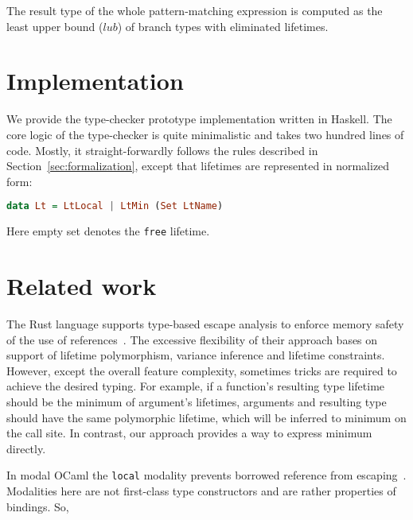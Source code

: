 \documentclass[11pt]{article}
\begin{document}
    The result type of the whole pattern-matching expression is computed as the least upper bound ($lub$) of branch types with eliminated lifetimes.


    \section{Implementation} \label{sec:implementation}

    We provide the type-checker prototype implementation written in Haskell.
    The core logic of the type-checker is quite minimalistic and takes two hundred lines of code.
    Mostly, it straight-forwardly follows the rules described in Section~\ref{sec:formalization}, except that lifetimes are represented in normalized form:
    \begin{lstlisting}[language=Haskell]
        data Lt = LtLocal | LtMin (Set LtName)
    \end{lstlisting}
    Here empty set denotes the \lstinline[language=Haskell]{free} lifetime.



    \section{Related work} \label{sec:related-work}


    The Rust language supports type-based escape analysis to enforce memory safety of the use of references~\cite{matsakis2014rust}.
    The excessive flexibility of their approach bases on support of lifetime polymorphism, variance inference and lifetime constraints.
    However, except the overall feature complexity, sometimes tricks are required to achieve the desired typing.
    For example, if a function's resulting type lifetime should be the minimum of argument's lifetimes, arguments and resulting type should have the same polymorphic lifetime, which will be inferred to minimum on the call site.
    In contrast, our approach provides a way to express minimum directly.

    In modal OCaml the \texttt{local} modality prevents borrowed reference from escaping~\cite{lorenzen2024oxidizing}.
    Modalities here are not first-class type constructors and are rather properties of bindings.
    So,
\end{document}
